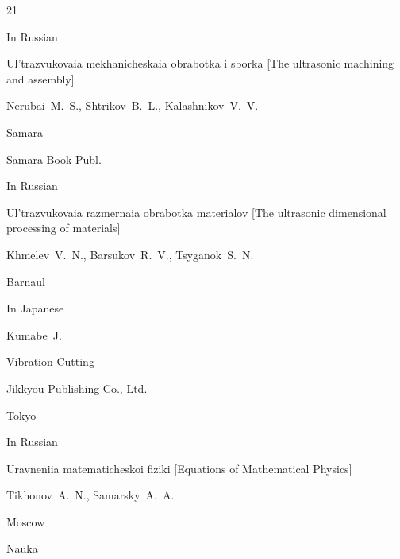\begin{thebibliography}{21}




\lang In Russian

\book Ul'trazvukovaia mekhanicheskaia obrabotka i sborka \rm [The ultrasonic machining and assembly]

\by Nerubai~M.~S., Shtrikov~B.~L., Kalashnikov~V.~V.

\publaddr Samara

\publ Samara Book Publ.










\lang In Russian

\book Ul'trazvukovaia razmernaia obrabotka materialov \rm[The ultrasonic dimensional processing of materials]

\by Khmelev~V.~N., Barsukov~R.~V., Tsyganok~S.~N.

\publaddr Barnaul








\lang In Japanese

\by Kumabe~J.

\book  Vibration Cutting 

\publ Jikkyou Publishing Co., Ltd.

\publaddr Tokyo





\lang In Russian

\book Uravneniia matematicheskoi fiziki \rm [Equations of Mathematical Physics]

\by Tikhonov~A.~N., Samarsky~A.~A.

\publaddr Moscow

\publ Nauka









\end{thebibliography}
